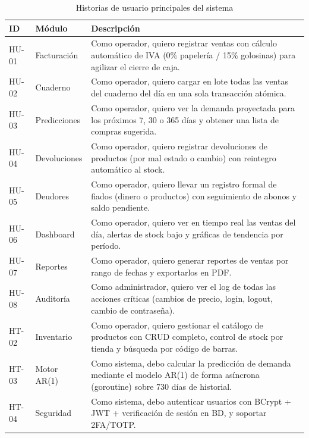 \documentclass[12pt,a4paper,oneside]{report}
\begin{document}
\begin{table}[H]
\centering
\caption{Historias de usuario principales del sistema}
\begin{tabularx}{\textwidth}{|l|l|X|}
\hline
\rowcolor{lightgray}
\textbf{ID} & \textbf{Módulo} & \textbf{Descripción} \\
\hline
HU-01 & Facturación & Como operador, quiero registrar ventas con cálculo automático de IVA (0\% papelería / 15\% golosinas) para agilizar el cierre de caja. \\
\hline
HU-02 & Cuaderno & Como operador, quiero cargar en lote todas las ventas del cuaderno del día en una sola transacción atómica. \\
\hline
HU-03 & Predicciones & Como operador, quiero ver la demanda proyectada para los próximos 7, 30 o 365 días y obtener una lista de compras sugerida. \\
\hline
HU-04 & Devoluciones & Como operador, quiero registrar devoluciones de productos (por mal estado o cambio) con reintegro automático al stock. \\
\hline
HU-05 & Deudores & Como operador, quiero llevar un registro formal de fiados (dinero o productos) con seguimiento de abonos y saldo pendiente. \\
\hline
HU-06 & Dashboard & Como operador, quiero ver en tiempo real las ventas del día, alertas de stock bajo y gráficas de tendencia por período. \\
\hline
HU-07 & Reportes & Como operador, quiero generar reportes de ventas por rango de fechas y exportarlos en PDF. \\
\hline
HU-08 & Auditoría & Como administrador, quiero ver el log de todas las acciones críticas (cambios de precio, login, logout, cambio de contraseña). \\
\hline
HT-02 & Inventario & Como operador, quiero gestionar el catálogo de productos con CRUD completo, control de stock por tienda y búsqueda por código de barras. \\
\hline
HT-03 & Motor AR(1) & Como sistema, debo calcular la predicción de demanda mediante el modelo AR(1) de forma asíncrona (goroutine) sobre 730 días de historial. \\
\hline
HT-04 & Seguridad & Como sistema, debo autenticar usuarios con BCrypt + JWT + verificación de sesión en BD, y soportar 2FA/TOTP. \\
\hline
\end{tabularx}
\label{tab:historias}
\end{table}
\end{document}
